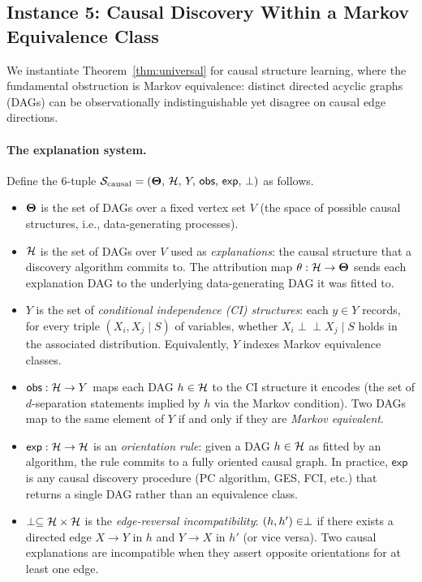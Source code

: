 \subsection{Instance 5: Causal Discovery Within a Markov Equivalence Class}
\label{sec:instance-causal}

We instantiate Theorem~\ref{thm:universal} for causal structure learning,
where the fundamental obstruction is Markov equivalence: distinct directed
acyclic graphs (DAGs) can be observationally indistinguishable yet disagree
on causal edge directions.

\paragraph{The explanation system.}
Define the 6-tuple $\mathcal{S}_{\mathrm{causal}} =
(\mathbf{\Theta},\, \mathcal{H},\, Y,\, \mathsf{obs},\, \mathsf{exp},\, \perp)$ as follows.

\begin{itemize}
  \item $\mathbf{\Theta}$ is the set of DAGs over a fixed vertex set $V$
    (the space of possible causal structures, i.e., data-generating processes).
  \item $\mathcal{H}$ is the set of DAGs over $V$ used as \emph{explanations}: the
    causal structure that a discovery algorithm commits to.  The attribution
    map $\theta : \mathcal{H} \to \mathbf{\Theta}$ sends each explanation DAG to the
    underlying data-generating DAG it was fitted to.
  \item $Y$ is the set of \emph{conditional independence (CI) structures}:
    each $y \in Y$ records, for every triple $(X_i, X_j \mid S)$ of
    variables, whether $X_i \perp\!\!\!\perp X_j \mid S$ holds in the
    associated distribution.  Equivalently, $Y$ indexes Markov equivalence
    classes.
  \item $\mathsf{obs} : \mathcal{H} \to Y$ maps each DAG $h \in \mathcal{H}$ to the
    CI structure it encodes (the set of $d$-separation statements implied by
    $h$ via the Markov condition).  Two DAGs map to the same element of $Y$
    if and only if they are \emph{Markov equivalent}.
  \item $\mathsf{exp} : \mathcal{H} \to \mathcal{H}$ is an \emph{orientation rule}: given
    a DAG $h \in \mathcal{H}$ as fitted by an algorithm, the rule commits to a fully
    oriented causal graph.  In practice, $\mathsf{exp}$ is any causal
    discovery procedure (PC algorithm, GES, FCI, etc.) that returns a single
    DAG rather than an equivalence class.
  \item $\perp \subseteq \mathcal{H} \times \mathcal{H}$ is the \emph{edge-reversal
    incompatibility}: $(h, h') \in \perp$ if there exists a directed edge
    $X \to Y$ in $h$ and $Y \to X$ in $h'$ (or vice versa).  Two causal
    explanations are incompatible when they assert opposite orientations for
    at least one edge.
\end{itemize}

